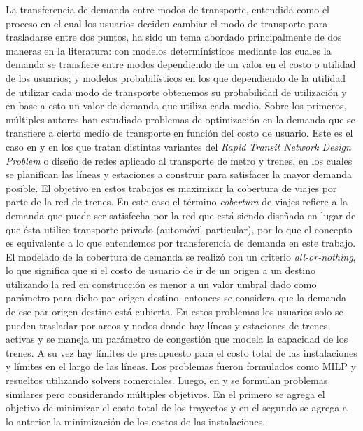   La transferencia de demanda entre modos de transporte, entendida como el proceso en el cual los usuarios deciden cambiar el modo de transporte para trasladarse entre dos puntos, ha sido un tema abordado principalmente de dos maneras en la literatura: con modelos determinísticos mediante los cuales la demanda se transfiere entre modos dependiendo de un valor en el costo o utilidad de los usuarios; y modelos probabilísticos en los que dependiendo de la utilidad de utilizar cada modo de transporte obtenemos su probabilidad de utilización y en base a esto un valor de demanda que utiliza cada medio. Sobre los primeros, múltiples autores han estudiado problemas de optimización en la demanda que se transfiere a cierto medio de transporte en función del costo de usuario. Este es el caso en \textcite{garcia2005} y \textcite{laporte2007} en los que tratan distintas variantes del {\it Rapid Transit Network Design Problem} o diseño de redes aplicado al transporte de metro y trenes, en los cuales se planifican las líneas y estaciones a construir para satisfacer la mayor demanda posible. El objetivo en estos trabajos es maximizar la cobertura de viajes por parte de la red de trenes. En este caso el término {\it cobertura} de viajes refiere a la demanda que puede ser satisfecha por la red que está siendo diseñada en lugar de que ésta utilice transporte privado (automóvil particular), por lo que el concepto es equivalente a lo que entendemos por transferencia de demanda en este trabajo. El modelado de la cobertura de demanda se realizó con un criterio {\it all-or-nothing}, lo que significa que si el costo de usuario de ir de un origen a un destino utilizando la red en construcción es menor a un valor umbral dado como parámetro para dicho par origen-destino, entonces se considera que la demanda de ese par origen-destino está cubierta. En estos problemas los usuarios solo se pueden trasladar por arcos y nodos donde hay líneas y estaciones de trenes activas y se maneja un parámetro de congestión que modela la capacidad de los trenes. A su vez hay límites de presupuesto para el costo total de las instalaciones y límites en el largo de las líneas. Los problemas fueron formulados como MILP y resueltos utilizando solvers comerciales. Luego, en \textcite{marin2007} y \textcite{cadarso2015} se formulan problemas similares pero considerando múltiples objetivos. En el primero se agrega el objetivo de minimizar el costo total de los trayectos y en el segundo se agrega a lo anterior la minimización de los costos de las instalaciones.

